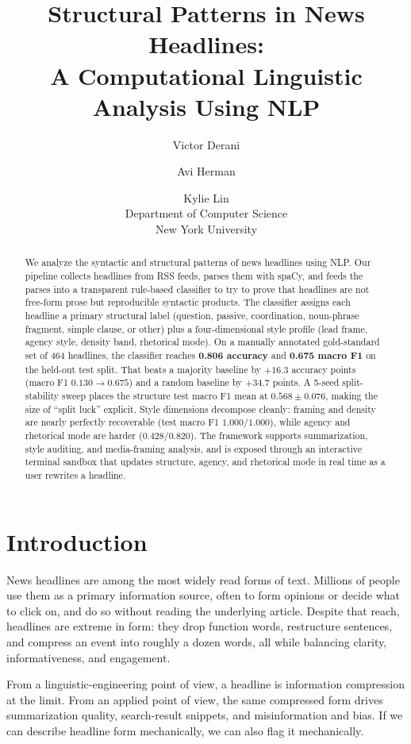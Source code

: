 \documentclass[11pt]{article}
\title{Structural Patterns in News Headlines:\\A Computational Linguistic Analysis Using NLP}
\author{Victor Derani \and Avi Herman \and Kylie Lin \\
  Department of Computer Science \\
  New York University \\
}
\begin{document}
\maketitle

\begin{abstract}
We analyze the syntactic and structural patterns of news headlines using NLP. Our pipeline collects headlines from RSS feeds, parses them with spaCy, and feeds the parses into a transparent rule-based classifier to try to prove that headlines are not free-form prose but reproducible syntactic products. The classifier assigns each headline a primary structural label (question, passive, coordination, noun-phrase fragment, simple clause, or other) plus a four-dimensional style profile (lead frame, agency style, density band, rhetorical mode). On a manually annotated gold-standard set of 464 headlines, the classifier reaches \textbf{0.806 accuracy} and \textbf{0.675 macro F1} on the held-out test split. That beats a majority baseline by $+16.3$ accuracy points (macro F1 $0.130 \rightarrow 0.675$) and a random baseline by $+34.7$ points. A 5-seed split-stability sweep places the structure test macro F1 mean at $\mathbf{0.568 \pm 0.076}$, making the size of ``split luck'' explicit. Style dimensions decompose cleanly: framing and density are nearly perfectly recoverable (test macro F1 $1.000 / 1.000$), while agency and rhetorical mode are harder ($0.428 / 0.820$). The framework supports summarization, style auditing, and media-framing analysis, and is exposed through an interactive terminal sandbox that updates structure, agency, and rhetorical mode in real time as a user rewrites a headline.
\end{abstract}

\section{Introduction}
News headlines are among the most widely read forms of text. Millions of people use them as a primary information source, often to form opinions or decide what to click on, and do so without reading the underlying article. Despite that reach, headlines are extreme in form: they drop function words, restructure sentences, and compress an event into roughly a dozen words, all while balancing clarity, informativeness, and engagement.

From a linguistic-engineering point of view, a headline is information compression at the limit. From an applied point of view, the same compressed form drives summarization quality, search-result snippets, and misinformation and bias. If we can describe headline form mechanically, we can also flag it mechanically.
\end{document}
